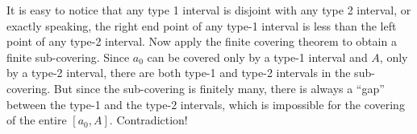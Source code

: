 \documentclass{article}
\begin{document}
\begin{Rmk}{}
\begin{compactenum}
    \end{compactenum}
    It is easy to notice that any type 1 interval is disjoint with any type 2 interval, or exactly speaking, the right end point of any type-1 interval is less than the left point of any type-2 interval. Now apply the finite covering theorem to obtain a finite sub-covering. Since $a_0$ can be covered only by a type-1 interval and $A$, only by a type-2 interval, there are both type-1 and type-2 intervals in the sub-covering. But since the sub-covering is finitely many, there is always a ``gap'' between the type-1 and the type-2 intervals, which is impossible for the covering of the entire $[a_0, A]$. Contradiction!
\end{Rmk}
\end{document}
